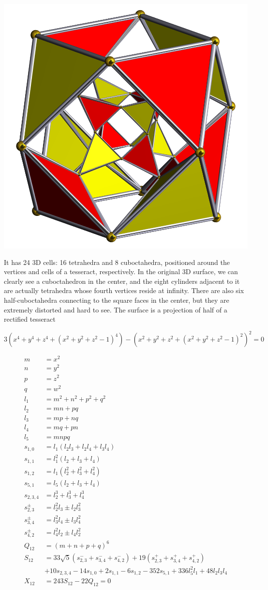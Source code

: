 \documentclass{article}
\begin{document}
\begin{center}
  \includegraphics[width=0.25\linewidth]{rit.png}
  \end{center}
It has 24 3D cells: 16 tetrahedra and 8 cuboctahedra,
positioned around the vertices and cells of a tesseract, respectively.
In the original 3D surface, we can clearly see a cuboctahedron in the center,
and the eight cylinders adjacent to it are actually tetrahedra
whose fourth vertices reside at infinity.
There are also six half-cuboctahedra connecting to the square faces in the center,
but they are extremely distorted and hard to see.
The surface is a projection of half of a rectified tesseract

$$3(x^4+y^4+z^4+(x^2+y^2+z^2-1)^4)-(x^2+y^2+z^2+(x^2+y^2+z^2-1)^2)^2 = 0$$

\begin{align*}
  m &= x^2 \\
  n &= y^2 \\
  p &= z^2 \\
  q &= w^2 \\
  l_1 &= m^2+n^2+p^2+q^2 \\
  l_2 &= mn+pq \\
  l_3 &= mp+nq \\
  l_4 &= mq+pn \\
  l_5 &= mnpq \\
  s_{1,0} &= l_1(l_2l_3+l_2l_4+l_3l_4) \\
  s_{1,1} &= l_1^2(l_2+l_3+l_4) \\
  s_{1,2} &= l_1(l_2^2+l_3^2+l_4^2) \\
  s_{5,1} &= l_5(l_2+l_3+l_4) \\
  s_{2,3,4} &= l_2^3+l_3^3+l_4^3 \\
  s_{2,3}^{\pm} &= l_2^2l_3 \pm l_2l_3^2 \\
  s_{3,4}^{\pm} &= l_3^2l_4 \pm l_3l_4^2 \\
  s_{4,2}^{\pm} &= l_4^2l_2 \pm l_4l_2^2 \\
  Q_{12} &= (m+n+p+q)^6 \\
  S_{12} &= 33\sqrt{5}(s_{2,3}^{-}+s_{3,4}^{-}+s_{4,2}^{-})+19(s_{2,3}^{+}+s_{3,4}^{+}+s_{4,2}^{+}) \\
  &+ 10s_{2,3,4}-14s_{1,0}+2s_{1,1}-6s_{1,2}-352s_{5,1}+336l_5^2l_1+48l_2l_3l_4 \\
  X_{12} &= 243S_{12}-22Q_{12}=0
\end{align*}
\end{document}
